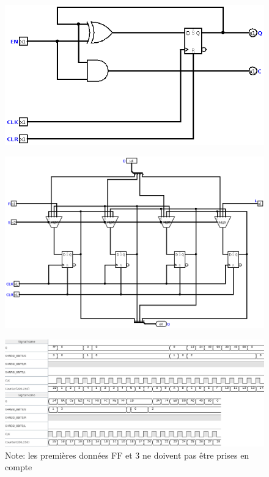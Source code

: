 \documentclass[a4paper]{article} %
\begin{document}
\begin{figure}[H]
\centering
    \includegraphics[width=1\textwidth]{src/COUNT_BASE.png}
    \label{fig:countBase}
\end{figure}

\begin{figure}[H]
\centering
    \includegraphics[width=1\textwidth]{src/SHREGI_4BITS.png}
    \label{fig:shregi4}
\end{figure}

\begin{figure}[H]
\centering
    \includegraphics[width=1\textwidth]{src/chrono_SHREG_8BITS.png}
    \label{fig:chrono_shregi8}
    Note: les premières données FF et 3 ne doivent pas être prises en compte
\end{figure}
\end{document}
